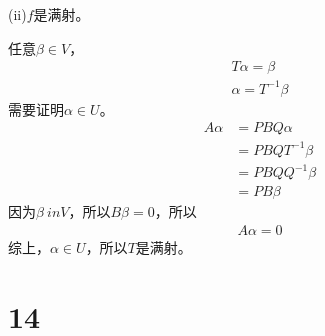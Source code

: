 \documentclass{article}
\begin{document}
\begin{itemize}
        (ii)$f$是满射。

        任意$\beta \in V$，
        \begin{align*}
          T \alpha = \beta \\
          \alpha = T^{-1} \beta
        \end{align*}
        需要证明$\alpha \in U$。
        \begin{align*}
          A \alpha & = PBQ \alpha       \\
                   & = PBQ T^{-1} \beta \\
                   & = PBQ Q^{-1} \beta \\
                   & = P B \beta 
        \end{align*}
        因为$\beta \ in V$，所以$B \beta = 0$，所以
        \begin{align*}
          A \alpha = 0
        \end{align*}
        综上，$\alpha \in U$，所以$T$是满射。

\end{itemize}

\section*{14}
\end{document}
